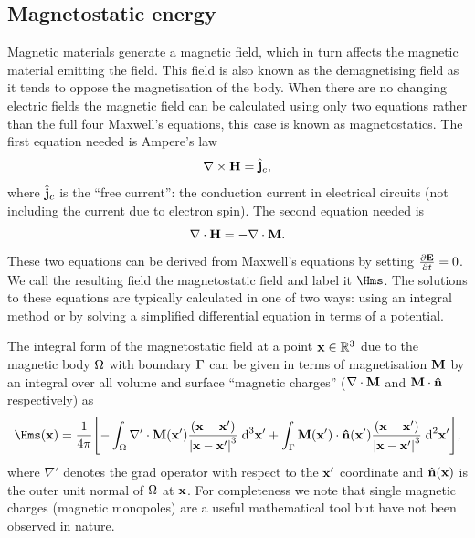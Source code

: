 \subsection{Magnetostatic energy}
\label{sec:magnetostatic-field}

Magnetic materials generate a magnetic field, which in turn affects the magnetic material emitting the field.
This field is also known as the demagnetising field as it tends to oppose the magnetisation of the body.
When there are no changing electric fields the magnetic field can be calculated using only two equations rather than the full four Maxwell's equations, this case is known as magnetostatics.
The first equation needed is Ampere's law \cite[33]{Coey2010}
\begin{equation}
  \nabla \times \boldsymbol{\mathrm{H}} = {\hat{\mathbf{j}}}_c,
\end{equation}
where ${\hat{\mathbf{j}}}_c$ is the ``free current'': the conduction current in electrical circuits (\ie not including the current due to electron spin).
The second equation needed is \cite[34]{Coey2010}
\begin{equation}
  \nabla \cdot \boldsymbol{\mathrm{H}} = - \nabla \cdot \boldsymbol{\mathrm{M}}.
\end{equation}
These two equations can be derived from Maxwell's equations by setting $\frac{\partial \mathbf{E}}{\partial t} = 0$.
We call the resulting field the magnetostatic field and label it $\Hms$.
The solutions to these equations are typically calculated in one of two ways: using an integral method or by solving a simplified differential equation in terms of a potential.

The integral form of the magnetostatic field at a point $\boldsymbol{\mathrm{x}} \in \mathbb{R}^3$ due to the magnetic body $\Omega$ with boundary ${\Gamma}$ can be given in terms of magnetisation $\boldsymbol{\mathrm{M}}$ by an integral over all volume and surface ``magnetic charges'' ($\nabla \cdot \boldsymbol{\mathrm{M}}$ and $\boldsymbol{\mathrm{M}} \cdot \boldsymbol{\mathrm{\hat{n}}}$ respectively) as
\begin{equation}
  \Hms(\xv) = \frac{1}{4 \pi} \bigs{
    - \int_\magd \nabla' \cdot \Mv(\xv') \frac{(\xv - \xv')}{\abs{\xv -\xv'}^3} \d^3 \xv'
    + \int_\boundd \Mv(\xv') \cdot \nv(\xv') \frac{(\xv - \xv')}{\abs{\xv - \xv'}^3} \d^2 \xv' },
  \label{eq:Hmsint}
\end{equation}
where $\nabla'$ denotes the grad operator with respect to the $\boldsymbol{\mathrm{x}}'$ coordinate and $\boldsymbol{\mathrm{\hat{n}}}(\boldsymbol{\mathrm{x}})$ is the outer unit normal of $\Omega$ at $\boldsymbol{\mathrm{x}}$.
For completeness we note that single magnetic charges (magnetic monopoles) are a useful mathematical tool but have not been observed in nature.

